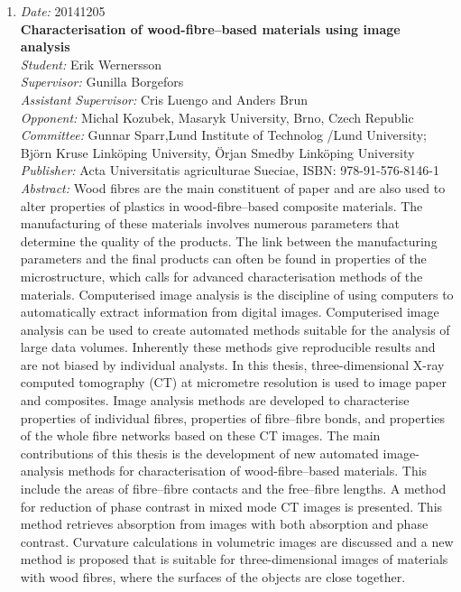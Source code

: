 {\begin{enumerate}
The work presented in this thesis has been part of the project Panvirshield, aiming for an automatic diagnostic system for viral pathogens using EM. The work is also part of the miniTEM project where a new desktop low-voltage electron microscope is developed with the aspiration to become an easy to use system reaching high levels of automation for clinical tissue sections, viruses and other nano-sized particles.

\item
{\em Date:} 20141205 ~\\
{\bf Characterisation of wood-fibre--based materials using image analysis}~\\
{\em Student:} Erik Wernersson~\\
{\em Supervisor:} Gunilla Borgefors~\\
{\em Assistant Supervisor:} Cris Luengo and Anders Brun~\\
{\em Opponent:} Michal Kozubek, Masaryk University, Brno, Czech Republic~\\
{\em Committee:}  Gunnar Sparr,Lund Institute of Technolog /Lund University; Bj\"{o}rn Kruse Link\"{o}ping University, \"{O}rjan Smedby Link\"{o}ping University~\\
{\em Publisher:}  Acta Universitatis agriculturae Sueciae, ISBN: 978-91-576-8146-1 ~\\ 
{\em Abstract:} Wood fibres are the main constituent of paper and are also used to alter properties of plastics in wood-fibre--based composite materials. The manufacturing of these materials involves numerous parameters that determine the quality of the products. The link between the manufacturing parameters and the final products can often be found in properties of the microstructure, which calls for advanced characterisation methods of the materials. Computerised image analysis is the discipline of using computers to automatically extract information from digital images. Computerised image analysis can be used to create automated methods suitable for the analysis of large data volumes. Inherently these methods give reproducible results and are not biased by individual analysts. In this thesis, three-dimensional X-ray computed tomography (CT) at micrometre resolution is used to image paper and composites. Image analysis methods are developed to characterise properties of individual fibres, properties of fibre--fibre bonds, and properties of the whole fibre networks based on these CT images. The main contributions of this thesis is the development of new automated image-analysis methods for characterisation of wood-fibre--based materials. This include the areas of fibre--fibre contacts and the free--fibre lengths. A method for reduction of phase contrast in mixed mode CT images is presented. This method retrieves absorption from images with both absorption and phase contrast. Curvature calculations in volumetric images are discussed and a new method is proposed that is suitable for three-dimensional images of materials with wood fibres, where the surfaces of the objects are close together.


\end{enumerate}}
